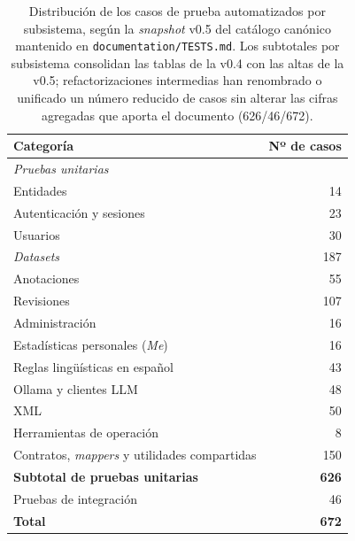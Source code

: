 \begin{table}[ht]
	\centering
	\begin{tabular}{lr}
		\hline
		\textbf{Categoría}                                              & \textbf{Nº de casos} \\
		\hline
		\multicolumn{2}{l}{\textit{Pruebas unitarias}}                                         \\
		\quad Entidades                                                 & 14                   \\
		\quad Autenticación y sesiones                                  & 23                   \\
		\quad Usuarios                                                  & 30                   \\
		\quad \textit{Datasets}                                         & 187                  \\
		\quad Anotaciones                                               & 55                   \\
		\quad Revisiones                                                & 107                  \\
		\quad Administración                                            & 16                   \\
		\quad Estadísticas personales (\textit{Me})                     & 16                   \\
		\quad Reglas lingüísticas en español                            & 43                   \\
		\quad Ollama y clientes LLM                                     & 48                   \\
		\quad XML                                                       & 50                   \\
		\quad Herramientas de operación                                 & 8                    \\
		\quad Contratos, \textit{mappers} y utilidades compartidas      & 150                  \\
		\hline
		\textbf{Subtotal de pruebas unitarias}                          & \textbf{626}         \\
		Pruebas de integración                                          & 46                   \\
		\hline
		\textbf{Total}                                                  & \textbf{672}         \\
		\hline
	\end{tabular}
	\caption[Distribución de los casos de prueba automatizados por
		subsistema según la \textit{snapshot} v0.5 del catálogo canónico.]{Distribución
		de los casos de prueba automatizados por subsistema,
		según la \textit{snapshot} v0.5 del catálogo canónico mantenido en
		\texttt{documentation/TESTS.md}. Los subtotales por subsistema
		consolidan las tablas de la v0.4 con las altas de la v0.5; refactorizaciones
		intermedias han renombrado o unificado un número reducido de casos sin
		alterar las cifras agregadas que aporta el documento (626/46/672).}
	\label{tab:tests-por-tipo}
\end{table}


